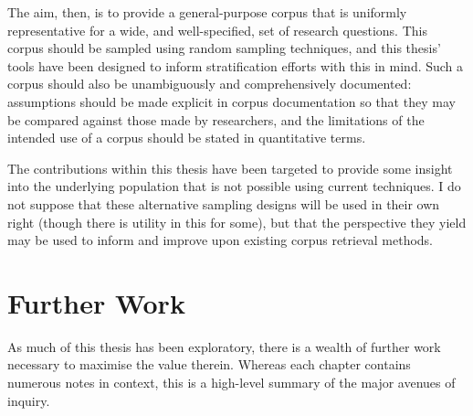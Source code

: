 The aim, then, is to provide a general-purpose corpus that is uniformly representative for a wide, and well-specified, set of research questions.  This corpus should be sampled using random sampling techniques, and this thesis' tools have been designed to inform stratification efforts with this in mind.  Such a corpus should also be unambiguously and comprehensively documented: assumptions should be made explicit in corpus documentation so that they may be compared against those made by researchers, and the limitations of the intended use of a corpus should be stated in quantitative terms.

The contributions within this thesis have been targeted to provide some insight into the underlying population that is not possible using current techniques.  I do not suppose that these alternative sampling designs will be used in their own right (though there is utility in this for some), but that the perspective they yield may be used to inform and improve upon existing corpus retrieval methods.















\section{Further Work}
As much of this thesis has been exploratory, there is a wealth of further work necessary to maximise the value therein.  Whereas each chapter contains numerous notes in context, this is a high-level summary of the major avenues of inquiry.



